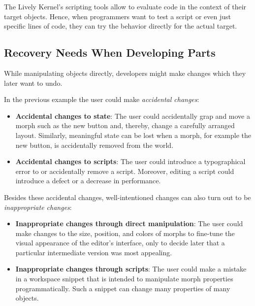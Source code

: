 The Lively Kernel's scripting tools allow to evaluate code in the context of their target objects.
Hence, when programmers want to test a script or even just specific lines of code, they can try the behavior directly for the actual target.


\subsection{Recovery Needs When Developing Parts}

While manipulating objects directly, developers might make changes which they later want to undo.

In the previous example the user could make \emph{accidental changes}:

\begin{itemize}
    \item \textbf{Accidental changes to state}: The user could accidentally grap and move a morph such as the new button and, thereby, change a carefully arranged layout. Similarly, meaningful state can be lost when a morph, for example the new button, is accidentally removed from the world.
    \item \textbf{Accidental changes to scripts}: The user could introduce a typographical error to or accidentally remove a script. Moreover, editing a script could introduce a defect or a decrease in performance.
\end{itemize}

Besides these accidental changes, well-intentioned changes can also turn out to be \emph{inappropriate changes}:

\begin{itemize}
    \item \textbf{Inappropriate changes through direct manipulation}: The user could make changes to the size, position, and colors of morphs to fine-tune the visual appearance of the editor's interface, only to decide later that a particular intermediate version was most appealing.
    \item \textbf{Inappropriate changes through scripts}: The user could make a mistake in a workspace snippet that is intended to manipulate morph properties programmatically. Such a snippet can change many properties of many objects.
\end{itemize}

